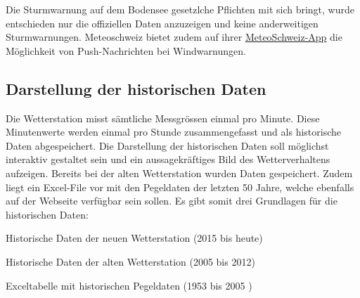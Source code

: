 \noindent
 Die Sturmwarnung auf dem Bodensee gesetzlche Pflichten mit sich bringt, wurde entschieden nur die offiziellen Daten anzuzeigen und keine anderweitigen Sturmwarnungen. Meteoschweiz bietet zudem auf ihrer  \href{https://www.meteoschweiz.admin.ch/home/service-und-publikationen/beratung-und-service/meteoschweiz-app.html}{MeteoSchweiz-App} die Möglichkeit von Push-Nachrichten bei Windwarnungen.







\subsection{Darstellung der historischen Daten}
Die Wetterstation misst sämtliche Messgrössen einmal pro Minute. Diese Minutenwerte werden einmal pro Stunde zusammengefasst und als historische Daten abgespeichert. Die Darstellung der historischen Daten soll möglichst interaktiv gestaltet sein und ein aussagekräftiges Bild des Wetterverhaltens aufzeigen. Bereits bei der alten Wetterstation wurden Daten gespeichert. Zudem liegt ein Excel-File vor mit den Pegeldaten der letzten 50 Jahre, welche ebenfalls auf der Webseite verfügbar sein sollen. Es gibt somit drei Grundlagen für die historischen Daten:

\begin{itemize*}
\item Historische Daten der neuen Wetterstation (2015 bis heute)
\item Historische Daten der alten Wetterstation (2005 bis 2012)
\item Exceltabelle mit historischen Pegeldaten (1953 bis 2005 )
\end{itemize*}

